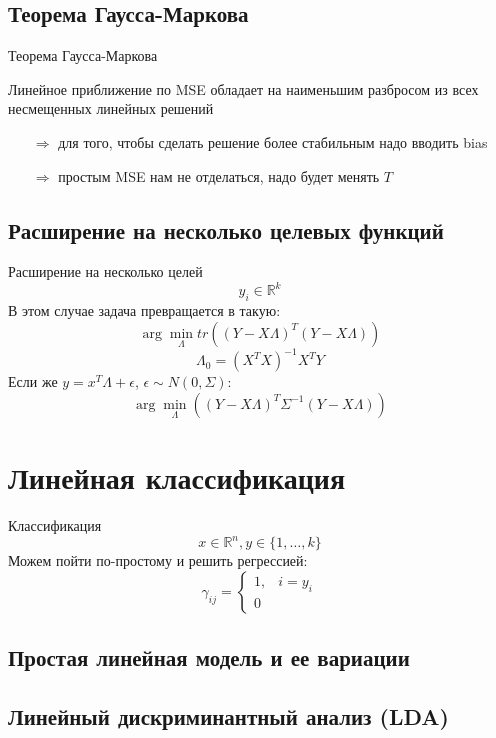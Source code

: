 \documentclass[14pt, fleqn, xcolor={dvipsnames, table}]{beamer}
\begin{document}
\subsection{Теорема Гаусса-Маркова}
\begin{frame}{Теорема Гаусса-Маркова}
\begin{theorem}[]
Линейное приближение по MSE обладает на наименьшим разбросом из всех несмещенных линейных решений
\end{theorem}
\begin{itemize}
\item[$\Rightarrow$] для того, чтобы сделать решение более стабильным надо вводить bias
\item[$\Rightarrow$] простым MSE нам не отделаться, надо будет менять $T$
\end{itemize}
\end{frame}

\subsection{Расширение на несколько целевых функций}
\begin{frame}{Расширение на несколько целей}
$$
y_i \in \mathbb{R}^k
$$
В этом случае задача превращается в такую:
$$
\arg \min_\Lambda tr\left((Y - X\Lambda)^T(Y - X\Lambda)\right)
$$
$$
\Lambda_0 = \left(X^TX\right)^{-1} X^TY
$$
Если же $y = x^T\Lambda + \epsilon$, $\epsilon \sim N(0, \Sigma)$:
$$
\arg \min_\Lambda \left((Y - X\Lambda)^T\Sigma^{-1}(Y - X\Lambda)\right)
$$
\end{frame}

\section{Линейная классификация}
\begin{frame}{Классификация}
$$
x \in \mathbb{R}^n, y \in \{1,\ldots, k\}
$$
Можем пойти по-простому и решить регрессией:
$$
\gamma_{ij} = \left\{\begin{array}{ll}
1,& i = y_i \\
0 
\end{array}\right.
$$
\end{frame}

\subsection{Простая линейная модель и ее вариации}
\subsection{Линейный дискриминантный анализ (LDA)}
\end{document}
